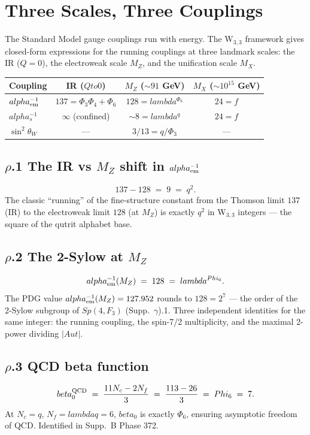\documentclass[12pt,a4paper]{article}
\def\mathbb#1{#1}%
\def\mathrm#1{#1}%
\def\alpha{alpha}%
\def\beta{beta}%
\def\lambda{lambda}%
\def\Phi#1{Phi#1}%
\def\cdot{ }%
\def\to{ to }%
\theoremstyle{definition}
\newcommand{\Sp}{\mathrm{Sp}}
\newcommand{\FF}{\mathbb{F}}
\begin{document}
\section*{Three Scales, Three Couplings}

The Standard Model gauge couplings run with energy. The W$_{3,3}$
framework gives closed-form expressions for the running couplings at
three landmark scales: the IR ($Q=0$), the electroweak scale $M_Z$,
and the unification scale $M_X$.

\begin{center}
\renewcommand{\arraystretch}{1.4}
\begin{tabular}{lccc}
\toprule
Coupling & IR ($Q\to 0$) & $M_Z$ ($\sim 91$ GeV) & $M_X$ ($\sim 10^{15}$ GeV) \\
\midrule
$\alpha_{\rm em}^{-1}$ & $137 = \Phi_3\Phi_4{+}\Phi_6$ & $128 = \lambda^{\Phi_6}$ & $24 = f$ \\
$\alpha_s^{-1}$ & $\infty$ (confined) & $\sim 8 = \lambda^q$ & $24 = f$ \\
$\sin^2\theta_W$ & --- & $3/13 = q/\Phi_3$ & --- \\
\bottomrule
\end{tabular}
\end{center}

\subsection*{$\rho$.1 \quad The IR vs $M_Z$ shift in $\alpha_{\rm em}^{-1}$}
\[
137 - 128 \;=\; 9 \;=\; q^2.
\]
The classic ``running'' of the fine-structure constant from the
Thomson limit $137$ (IR) to the electroweak limit $128$ (at $M_Z$) is
exactly $q^2$ in W$_{3,3}$ integers — the square of the qutrit
alphabet base.

\subsection*{$\rho$.2 \quad The 2-Sylow at $M_Z$}
\[
\alpha_{\rm em}^{-1}(M_Z) \;=\; 128 \;=\; \lambda^{\Phi_6}.
\]
The PDG value $\alpha_{\rm em}^{-1}(M_Z) = 127.952$ rounds to
$128 = 2^7$ — the order of the 2-Sylow subgroup of $\Sp(4,\FF_3)$
(Supp.~$\gamma$).1. Three independent identities for the same integer:
the running coupling, the spin-7/2 multiplicity, and the maximal
2-power dividing $|Aut|$.

\subsection*{$\rho$.3 \quad QCD beta function}
\[
\beta_0^{\rm QCD} \;=\; \frac{11 N_c - 2 N_f}{3} \;=\; \frac{11\cdot 3 - 2\cdot 6}{3} \;=\; \Phi_6 \;=\; 7.
\]
At $N_c = q$, $N_f = \lambda q = 6$, $\beta_0$ is exactly $\Phi_6$,
ensuring asymptotic freedom of QCD. Identified in Supp.~B Phase 372.
\end{document}
